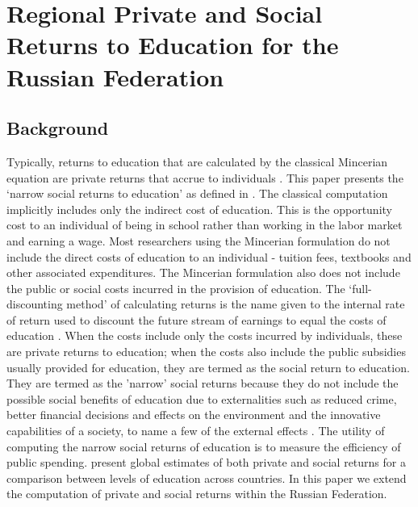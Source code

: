 \documentclass[alpha-refs]{wiley-article-05g}
\begin{document}
\vspace{-0.2in}

\section{Regional Private and Social Returns to Education for the Russian Federation}

\subsection{Background}

Typically, returns to education that are calculated by the classical 
Mincerian 
equation are private returns that accrue to individuals 
\parencite{mincer1974}. This paper presents the `narrow social returns to 
education' as defined in \cite{psacharopoulos2019}. The classical 
computation implicitly includes only the indirect cost of education. This 
is the opportunity cost to an individual of being in school rather than 
working in the labor market and earning a wage. Most researchers using the 
Mincerian 
formulation do not include the direct costs of education to an individual 
- tuition fees, textbooks and other associated expenditures. The Mincerian 
formulation also does not include the public or social costs incurred in 
the provision of education. The `full-discounting method' of calculating 
returns is the name given to the internal rate of return used to discount 
the future stream of earnings to equal the costs of education 
\parencite{psacharopoulos1995}. When the costs include only the costs 
incurred by individuals, these are private returns to education; when the 
costs also include the public subsidies usually provided for education, 
they are termed as the social return to education. They are termed as the 
'narrow' social returns because they do not include the possible social 
benefits of education due to externalities such as reduced crime, better 
financial decisions and effects on the environment and the innovative 
capabilities of a society, to name a few of the external effects 
\parencite{wolfe2002,mcmahon2004,owens2004}.  The utility of computing the 
narrow social returns of education is to measure the efficiency of public 
spending. \cite{Psacharopoulos_Patrinos2018} present global estimates of 
both private and social returns for a comparison between levels of 
education across countries. In this paper we extend the computation of 
private and social returns within the Russian Federation. 
\end{document}
